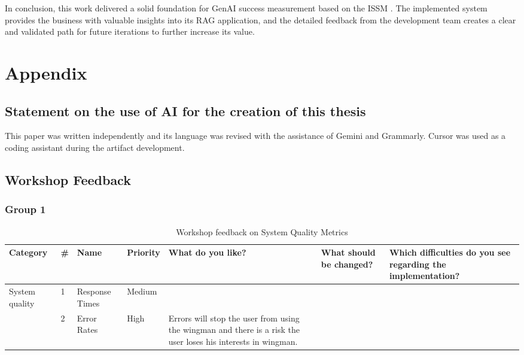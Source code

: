 \documentclass[
	english,
	ruledheaders=section,%
	class=report,%
	thesis={type=bachelor},%
	accentcolor=1b,%
	custommargins=true,%
	marginpar=false,%
	parskip=half-,%
	fontsize=11pt,%
	DIV=14,
]{tudapub}
\begin{document}
In conclusion, this work delivered a solid foundation for GenAI success measurement based on the ISSM \parencite{DeloneMcLean2003ISSuccessTenYearUpdate}. The implemented system provides the business with valuable insights into its RAG application, and the detailed feedback from the development team creates a clear and validated path for future iterations to further increase its value.
\appendix

\chapter*{Appendix}

\setcounter{page}{\value{seitenzahlroemisch}}

\section*{Statement on the use of AI for the creation of this thesis}
This paper was written independently and its language was revised with the assistance of Gemini and Grammarly. Cursor was used as a coding assistant during the artifact development.

\section*{Workshop Feedback}
\subsection*{Group 1}

\begin{table}
    \centering
    \small 
    \caption{Workshop feedback on System Quality Metrics}
    \label{tab:system_quality}
    \begin{tabularx}{\textheight}{p{2.2cm} l >{\RaggedRight\arraybackslash}X l >{\RaggedRight\arraybackslash}X >{\RaggedRight\arraybackslash}X >{\RaggedRight\arraybackslash}X}
        \toprule
        \textbf{Category} & \textbf{\#} & \textbf{Name} & \textbf{Priority} & \textbf{What do you like?} & \textbf{What should be changed?} & \textbf{Which difficulties do you see regarding the implementation?} \\
        \midrule
        
        \multirow{2}{=}{System quality} 
        & 1 & Response Times & Medium & & & \\
        \cmidrule(l){2-7}
        & 2 & Error Rates & High & Errors will stop the user from using the wingman and there is a risk the user loses his interests in wingman. & & \\
        \bottomrule
    \end{tabularx}
\end{table}
\end{document}

